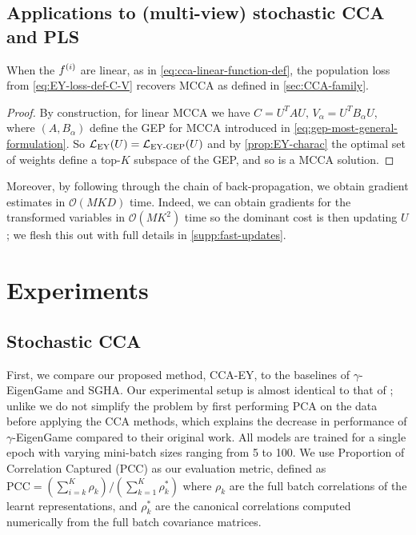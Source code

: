 \subsection{Applications to (multi-view) stochastic CCA and PLS}
\begin{lemma}
    When the $f^{(i)}$ are linear, as in \cref{eq:cca-linear-function-def}, the population loss from \cref{eq:EY-loss-def-C-V} recovers MCCA as defined in \cref{sec:CCA-family}.
\end{lemma}
\begin{proof}
    By construction, for linear MCCA we have $C = U^T A U,\, V_\alpha=U^T B_\alpha U$, where $(A, B_\alpha)$ define the GEP for MCCA introduced in \cref{eq:gep-most-general-formulation}.
    So $\mathcal{L}_\text{EY}(U) = \mathcal{L}_\text{EY-GEP}(U)$ and by \cref{prop:EY-charac} the optimal set of weights define a top-$K$ subspace of the GEP, and so is a MCCA solution.
\end{proof}

Moreover, by following through the chain of back-propagation, we obtain gradient estimates in $\mathcal{O}(MKD)$ time.
Indeed, we can obtain gradients for the transformed variables in $\mathcal{O}(M K^2)$ time so the dominant cost is then updating $U$; we flesh this out with full details in \cref{supp:fast-updates}.

\section{Experiments}

\subsection{Stochastic CCA}
First, we compare our proposed method, CCA-EY, to the baselines of $\gamma$-EigenGame and SGHA.
Our experimental setup is almost identical to that of \cite{meng2021online, gemp2022generalized}; unlike \cite{gemp2022generalized} we do not simplify the problem by first performing PCA on the data before applying the CCA methods, which explains the decrease in performance of $\gamma$-EigenGame compared to their original work.
All models are trained for a single epoch with varying mini-batch sizes ranging from 5 to 100. We use Proportion of Correlation Captured (PCC) as our evaluation metric, defined as \( \text{PCC} = (\sum_{i=k}^K \rho_k)/ ({\sum_{k=1}^K \rho_k^*}) \) where $\rho_k$ are the full batch correlations of the learnt representations, and $\rho_k^*$ are the canonical correlations computed numerically from the full batch covariance matrices.

